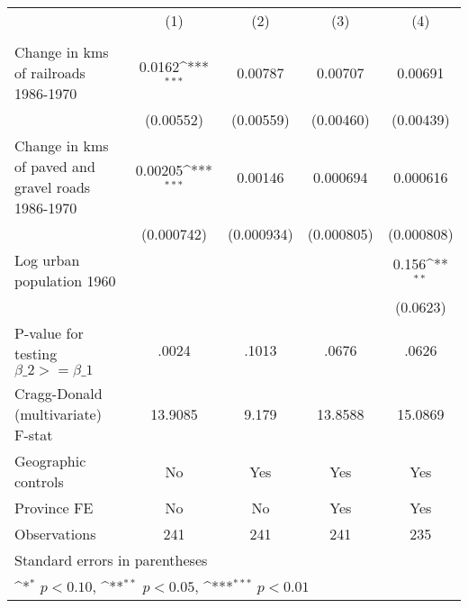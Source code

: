 {
\def\sym#1{\ifmmode^{#1}\else\(^{#1}\)\fi}
\begin{tabular}{l*{4}{c}}
\hline\hline
                &\multicolumn{1}{c}{(1)}&\multicolumn{1}{c}{(2)}&\multicolumn{1}{c}{(3)}&\multicolumn{1}{c}{(4)}\\
                &\multicolumn{1}{c}{}&\multicolumn{1}{c}{}&\multicolumn{1}{c}{}&\multicolumn{1}{c}{}\\
\hline
Change in kms of railroads 1986-1970&   0.0162\sym{***}&  0.00787         &  0.00707         &  0.00691         \\
                &(0.00552)         &(0.00559)         &(0.00460)         &(0.00439)         \\
[1em]
Change in kms of paved and gravel roads 1986-1970&  0.00205\sym{***}&  0.00146         & 0.000694         & 0.000616         \\
                &(0.000742)         &(0.000934)         &(0.000805)         &(0.000808)         \\
[1em]
Log urban population 1960&                  &                  &                  &    0.156\sym{**} \\
                &                  &                  &                  & (0.0623)         \\
\hline
P-value for testing $\beta\_{2} >= \beta\_{1}$&    .0024         &    .1013         &    .0676         &    .0626         \\
Cragg-Donald (multivariate) F-stat&  13.9085         &    9.179         &  13.8588         &  15.0869         \\
Geographic controls&       No         &      Yes         &      Yes         &      Yes         \\
Province FE     &       No         &       No         &      Yes         &      Yes         \\
Observations    &      241         &      241         &      241         &      235         \\
\hline\hline
\multicolumn{5}{l}{\footnotesize Standard errors in parentheses}\\
\multicolumn{5}{l}{\footnotesize \sym{*} \(p<0.10\), \sym{**} \(p<0.05\), \sym{***} \(p<0.01\)}\\
\end{tabular}
}
